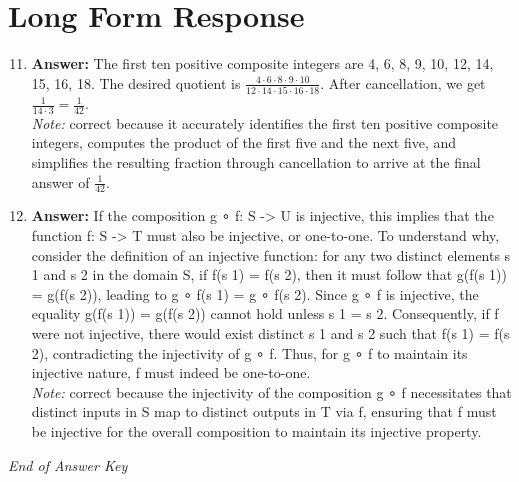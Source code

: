 \documentclass[12pt]{article}
\begin{document}
\section*{Long Form Response}
\begin{enumerate}[label=\arabic*.]
\setcounter{enumi}{10}
\item \textbf{Answer:} The first ten positive composite integers are 4, 6, 8, 9, 10, 12, 14, 15, 16, 18. The desired quotient is $\frac{4\cdot 6\cdot 8\cdot 9\cdot 10}{12\cdot 14\cdot 15\cdot 16\cdot 18}$. After cancellation, we get $\frac{1}{14\cdot 3}=\boxed{\frac{1}{42}}$.
\\ \textit{Note:} correct because it accurately identifies the first ten positive composite integers, computes the product of the first five and the next five, and simplifies the resulting fraction through cancellation to arrive at the final answer of \(\frac{1}{42}\).
\item \textbf{Answer:} If the composition g ∘ f: S -\textgreater{} U is injective, this implies that the function f: S -\textgreater{} T must also be injective, or one-to-one. To understand why, consider the definition of an injective function: for any two distinct elements s 1 and s 2 in the domain S, if f(s 1) = f(s 2), then it must follow that g(f(s 1)) = g(f(s 2)), leading to g ∘ f(s 1) = g ∘ f(s 2). Since g ∘ f is injective, the equality g(f(s 1)) = g(f(s 2)) cannot hold unless s 1 = s 2. Consequently, if f were not injective, there would exist distinct s 1 and s 2 such that f(s 1) = f(s 2), contradicting the injectivity of g ∘ f. Thus, for g ∘ f to maintain its injective nature, f must indeed be one-to-one.
\\ \textit{Note:} correct because the injectivity of the composition g ∘ f necessitates that distinct inputs in S map to distinct outputs in T via f, ensuring that f must be injective for the overall composition to maintain its injective property.
\end{enumerate}

\vfill
\noindent\textit{End of Answer Key}
\end{document}

